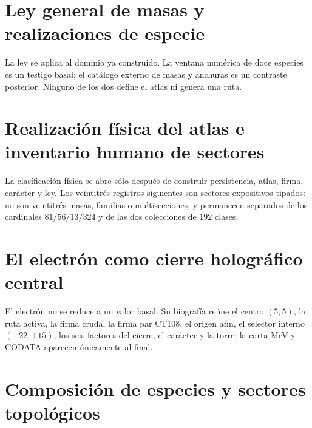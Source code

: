 \chapter{Ley general de masas y realizaciones de especie}
\label{chap:ley-masas-rev7}
La ley se aplica al dominio ya construido. La ventana numérica de doce
especies es un testigo basal; el catálogo externo de masas y anchuras es un
contraste posterior. Ninguno de los dos define el atlas ni genera una ruta.
\HMTDemoteHeadings


\HMTRestoreHeadings

\chapter{Realización física del atlas e inventario humano de sectores}
\label{chap:inventario-sectores-rev8}
La clasificación física se abre sólo después de construir persistencia,
atlas, firma, carácter y ley. Los veintitrés registros siguientes
son sectores expositivos tipados: no son veintitrés masas, familias o
multisecciones, y permanecen separados de los cardinales
\(81/56/13/324\) y de las dos colecciones de \(192\) clases.
\HMTDemoteHeadings
\def\HMTIncludeAtlasPhysical{1}

\let\HMTIncludeAtlasPhysical\undefined
\HMTRestoreHeadings

\chapter{El electrón como cierre holográfico central}
\label{chap:electron-rev8}
El electrón no se reduce a un valor basal. Su biografía reúne el centro
\((5,5)\), la ruta activa, la firma cruda, la firma par CT108, el origen
afín, el selector interno \((-22,+15)\), los seis factores del cierre, el
carácter y la torre; la carta MeV y CODATA aparecen únicamente al final.
\HMTDemoteHeadings

\HMTRestoreHeadings

\chapter{Composición de especies y sectores topológicos}
\label{chap:composicion-topologica-rev7}
\HMTDemoteHeadings

\def\HMTIncludeCMBlock{1}
\def\HMTIncludeTopologicalBlock{1}

\let\HMTIncludeTopologicalBlock\undefined
\let\HMTIncludeCMBlock\undefined
\HMTRestoreHeadings

